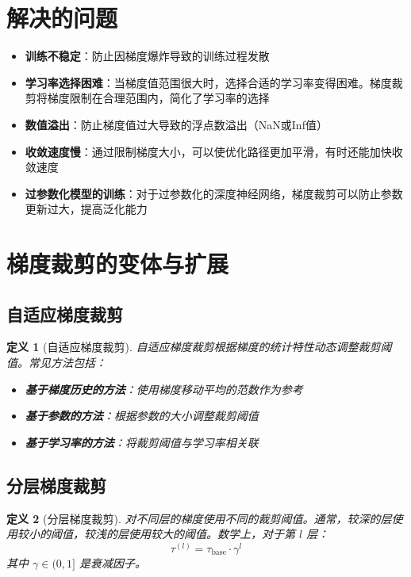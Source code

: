 \documentclass{article}
\newtheorem{definition}{定义}[section]
\begin{document}
\section{解决的问题}

\begin{itemize}
    \item \textbf{训练不稳定}：防止因梯度爆炸导致的训练过程发散
    \item \textbf{学习率选择困难}：当梯度值范围很大时，选择合适的学习率变得困难。梯度裁剪将梯度限制在合理范围内，简化了学习率的选择
    \item \textbf{数值溢出}：防止梯度值过大导致的浮点数溢出（NaN或Inf值）
    \item \textbf{收敛速度慢}：通过限制梯度大小，可以使优化路径更加平滑，有时还能加快收敛速度
    \item \textbf{过参数化模型的训练}：对于过参数化的深度神经网络，梯度裁剪可以防止参数更新过大，提高泛化能力
\end{itemize}

\section{梯度裁剪的变体与扩展}

\subsection{自适应梯度裁剪}

\begin{definition}[自适应梯度裁剪]
自适应梯度裁剪根据梯度的统计特性动态调整裁剪阈值。常见方法包括：
\begin{itemize}
    \item \textbf{基于梯度历史的方法}：使用梯度移动平均的范数作为参考
    \item \textbf{基于参数的方法}：根据参数的大小调整裁剪阈值
    \item \textbf{基于学习率的方法}：将裁剪阈值与学习率相关联
\end{itemize}
\end{definition}

\subsection{分层梯度裁剪}

\begin{definition}[分层梯度裁剪]
对不同层的梯度使用不同的裁剪阈值。通常，较深的层使用较小的阈值，较浅的层使用较大的阈值。数学上，对于第 $l$ 层：
\[
\tau^{(l)} = \tau_{\text{base}} \cdot \gamma^l
\]
其中 $\gamma \in (0, 1]$ 是衰减因子。
\end{definition}
\end{document}
